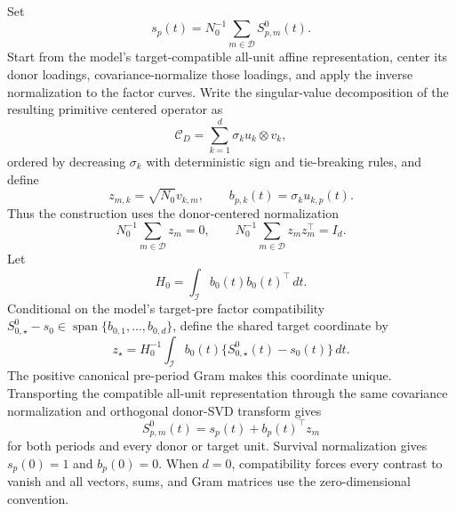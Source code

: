 Set
\[
 s_p(t)=N_0^{-1}\sum_{m\in\mathcal D}S^0_{p,m}(t).
\]
Start from the model's target-compatible all-unit affine representation, center its donor loadings, covariance-normalize those loadings, and apply the inverse normalization to the factor curves. Write the singular-value decomposition of the resulting primitive centered operator as
\[
 \mathcal C_D=\sum_{k=1}^d\sigma_k u_k\otimes v_k,
\]
ordered by decreasing \(\sigma_k\) with deterministic sign and tie-breaking rules, and define
\[
 z_{m,k}=\sqrt{N_0}v_{k,m},
 \qquad b_{p,k}(t)=\sigma_k u_{k,p}(t).
\]
Thus the construction uses the donor-centered normalization
\[
 N_0^{-1}\sum_{m\in\mathcal D}z_m=0,
 \qquad N_0^{-1}\sum_{m\in\mathcal D}z_mz_m^\top=I_d.
\]
Let
\[
 H_0=\int_{\mathcal I}b_0(t)b_0(t)^\top\,dt.
\]
Conditional on the model's target-pre factor compatibility
\(S^0_{0,\star}-s_0\in\operatorname{span}\{b_{0,1},\ldots,b_{0,d}\}\), define the shared target coordinate by
\[
 z_\star=H_0^{-1}\int_{\mathcal I}b_0(t)
 \{S^0_{0,\star}(t)-s_0(t)\}\,dt.
\]
The positive canonical pre-period Gram makes this coordinate unique. Transporting the compatible all-unit representation through the same covariance normalization and orthogonal donor-SVD transform gives
\[
 S^0_{p,m}(t)=s_p(t)+b_p(t)^\top z_m
\]
for both periods and every donor or target unit. Survival normalization gives \(s_p(0)=1\) and \(b_p(0)=0\). When \(d=0\), compatibility forces every contrast to vanish and all vectors, sums, and Gram matrices use the zero-dimensional convention.